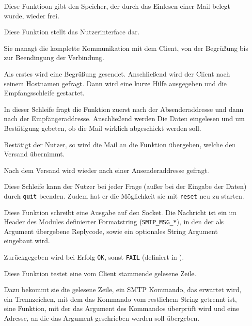 \label{fn:user_clean_mail_data}
Diese Funktioon gibt den Speicher, der durch das Einlesen einer Mail belegt wurde, wieder frei.

\label{fn:user_start_session}
Diese Funktion stellt das Nutzerinterface dar.

Sie managt die komplette Kommunikation mit dem Client, von der Begr\"{u}ßung bis zur Beendingung der Verbindung.

Als erstes wird eine Begr\"{u}ßung gesendet. Anschließend wird der Client nach seinem Hostnamen gefragt. Dann wird eine kurze Hilfe ausgegeben und die Empfangsschleife gestartet.

In dieser Schleife fragt die Funktion zuerst nach der Absenderaddresse und dann nach der Empf\"{a}ngeraddresse. Anschließend werden Die Daten eingelesen und um Best\"{a}tigung gebeten, ob die Mail wirklich abgeschickt werden soll.

Best\"{a}tigt der Nutzer, so wird die Mail an die Funktion  \"{u}bergeben, welche den Versand \"{u}bernimmt.

Nach dem Versand wird wieder nach einer Ansenderaddresse gefragt.

Diese Schleife kann der Nutzer bei jeder Frage (außer bei der Eingabe der Daten) durch \texttt{quit} beenden. Zudem hat er die M\"{o}glichkeit sie mit \texttt{reset} neu zu starten. 



\label{fn:smtp_write_client_msg}
Diese Funktion schreibt eine Ausgabe auf den Socket. Die Nachricht ist ein im Header des Modules  definierter Formatstring (\texttt{SMTP\_MSG\_*}), in den der als Argument \"{u}bergebene Replycode, sowie ein optionales String Argument eingebaut wird.

Zur\"{u}ckgegeben wird bei Erfolg \texttt{OK}, sonst \texttt{FAIL} (definiert in ).

\label{fn:smtp_check_input}
Diese Funktion testet eine vom Client stammende gelesene Zeile.

Dazu bekommt sie die gelesene Zeile, ein SMTP Kommando, das erwartet wird, ein Trennzeichen, mit dem das Kommando vom restlichem String getrennt ist, eine Funktion, mit der das Argument des Kommandos \"{u}berpr\"{u}ft wird und eine Adresse, an die das Argument geschrieben werden soll \"{u}bergeben.

